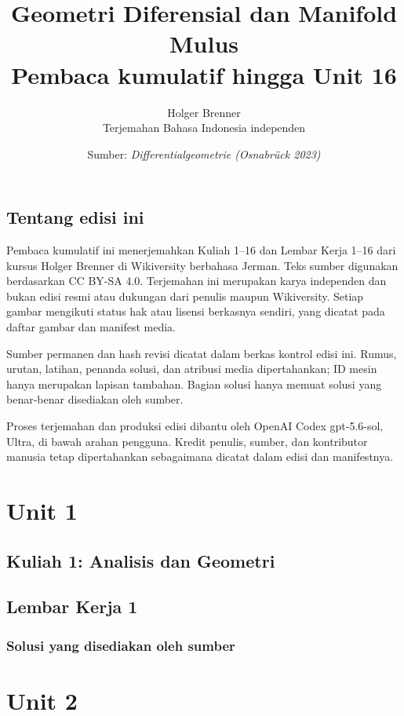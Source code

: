 \documentclass[11pt,a4paper,oneside]{book}
\title{Geometri Diferensial dan Manifold Mulus\\\large Pembaca kumulatif hingga Unit 16}
\author{Holger Brenner\\Terjemahan Bahasa Indonesia independen}
\date{Sumber: \textit{Differentialgeometrie (Osnabrück 2023)}}
\begin{document}
\hypersetup{pageanchor=false}
\maketitle
\hypersetup{pageanchor=true}
\frontmatter
\chapter*{Tentang edisi ini}
Pembaca kumulatif ini menerjemahkan Kuliah 1--16 dan Lembar Kerja 1--16 dari kursus Holger Brenner di Wikiversity berbahasa Jerman. Teks sumber digunakan berdasarkan CC BY-SA 4.0. Terjemahan ini merupakan karya independen dan bukan edisi resmi atau dukungan dari penulis maupun Wikiversity. Setiap gambar mengikuti status hak atau lisensi berkasnya sendiri, yang dicatat pada daftar gambar dan manifest media.

Sumber permanen dan hash revisi dicatat dalam berkas kontrol edisi ini. Rumus, urutan, latihan, penanda solusi, dan atribusi media dipertahankan; ID mesin hanya merupakan lapisan tambahan. Bagian solusi hanya memuat solusi yang benar-benar disediakan oleh sumber.

Proses terjemahan dan produksi edisi dibantu oleh OpenAI Codex gpt-5.6-sol, Ultra, di bawah arahan pengguna. Kredit penulis, sumber, dan kontributor manusia tetap dipertahankan sebagaimana dicatat dalam edisi dan manifestnya.
\tableofcontents

\mainmatter
\part{Unit 1}
\chapter[Kuliah 1]{Kuliah 1: Analisis dan Geometri}


\chapter{Lembar Kerja 1}


\section*{Solusi yang disediakan oleh sumber}


\part{Unit 2}
\end{document}
